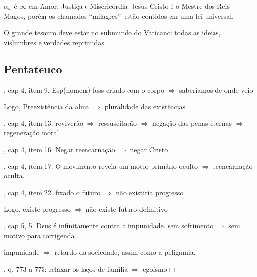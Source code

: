 \documentclass[12pt,a4paper]{article}
\begin{document}
		$ \alpha_\omega $ \'e $ \infty $ em Amor, Justi\c{c}a e Miseric\'ordia. Jesus Cristo \'e o Mestre dos Reis Magos, por\'em os chamados \textquotedblleft milagres\textquotedblright\, est\~ao contidos em uma lei universal.

		O grande tesouro deve estar no submundo do Vaticano: todas as ideias, vislumbres e verdades reprimidas.

	\subsection{Pentateuco}
			\begin{flushright}
			\end{flushright}

\cite{ese}, cap 4, item 9. Esp(homem) foss criado com o corpo $\Rightarrow$ saber\'iamos de onde veio

Logo, Preexist\^encia da alma $\Rightarrow$ pluralidade das exist\^encias

			\begin{flushright}
			\end{flushright}

\cite{ese}, cap 4, item 13. reviver\~ao $\Rightarrow$ ressuscitar\~ao $\Rightarrow$ nega\c{c}\~ao das penas eternas $\Rightarrow$ regenera\c{c}\~ao moral

\cite{ese}, cap 4, item 16. Negar reencarna\c{c}\~ao $\Rightarrow$ negar Cristo

\cite{ese}, cap 4, item 17. O movimento revela um motor prim\'ario oculto $\Rightarrow$ reencarna\c{c}\~ao oculta.

\cite{ese}, cap 4, item 22. fixado o futuro $\Rightarrow$ n\~ao existiria progresso

Logo, existe progresso $\Rightarrow$ n\~ao existe futuro definitivo

			\begin{flushright}
			\end{flushright}

\cite{ese}, cap 5, 5. Deus \'e infinitamente contra a impunidade. sem sofrimento $\Rightarrow$ sem motivo para corrigenda

impunidade $\Rightarrow$ retardo da sociedade, assim como a poligamia.

			\begin{flushright}
			\end{flushright}

\cite{le}, q. 773 a 775: relaxar os la\c{c}os de fam\'ilia $\Rightarrow$ ego\'ismo++
\end{document}
